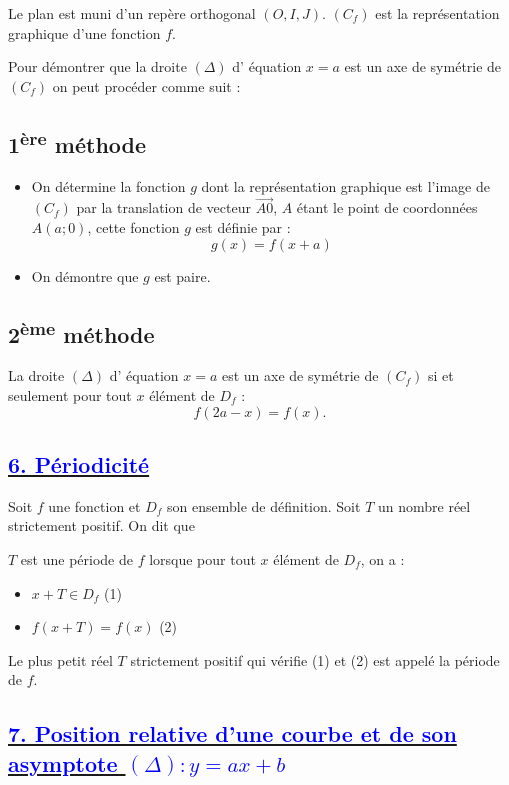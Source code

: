 \documentclass{article}
\begin{document}
Le plan est muni d’un repère orthogonal $(O, I, J)$. $(C_f)$ est la représentation graphique d’une fonction $f$.

Pour démontrer que la droite $(\Delta)$ d' équation $x = a$ est un axe de symétrie de $(C_f)$ on peut procéder comme suit :

\subsection*{1\textsuperscript{ère} méthode}

\begin{itemize}
    \item On détermine la fonction $g$ dont la représentation graphique est l’image de $(C_f)$ par la translation de vecteur $\overrightarrow{A0}$, $A$ étant le point de coordonnées $A(a; 0)$, cette fonction $g$ est définie par :
    \[
    g(x) = f(x + a)
    \]
    \item On démontre que $g$ est paire.
\end{itemize}

\subsection*{2\textsuperscript{ème} méthode}

La droite $(\Delta)$ d' équation $x = a$ est un axe de symétrie de $(C_f)$ si et seulement pour tout $x$ élément de $D_f$ :
\[
f(2a - x) = f(x).
\]


\subsection*{\underline{\textbf{\textcolor{blue}{6. Périodicité}}}}

Soit $f$ une fonction et $D_f$ son ensemble de définition. Soit $T$ un nombre réel strictement positif. On dit que 

$T$ est une période de $f$ lorsque pour tout $x$ élément de $D_f$, on a :

\begin{itemize}
    \item $x + T \in D_f$ \hfill (1)
    \item $f(x + T) = f(x)$ \hfill (2)
\end{itemize}

Le plus petit réel $T$ strictement positif qui vérifie (1) et (2) est appelé la période de $f$.
\subsection*{\underline{\textbf{\textcolor{blue}{7. Position relative d’une courbe et de son asymptote \( (\Delta): y = ax + b \)}}}}
\end{document}
